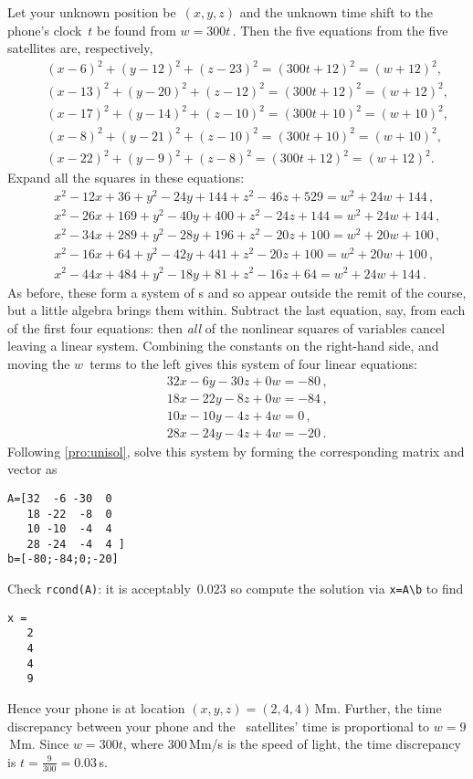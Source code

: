 \begin{example}
\begin{solution} 
Let your unknown position be~\((x,y,z)\) and the unknown time shift to the phone's clock~\(t\) be found from \(w=300t\)\,.
Then the five equations from the five satellites are, respectively,
\begin{eqnarray*}
&&(x-6)^2+(y-12)^2+(z-23)^2=(300t+12)^2=(w+12)^2,
\\&&(x-13)^2+(y-20)^2+(z-12)^2=(300t+12)^2=(w+12)^2,
\\&&(x-17)^2+(y-14)^2+(z-10)^2=(300t+10)^2=(w+10)^2,
\\&&(x-8)^2+(y-21)^2+(z-10)^2=(300t+10)^2=(w+10)^2,
\\&&(x-22)^2+(y-9)^2+(z-8)^2=(300t+12)^2=(w+12)^2.
\end{eqnarray*}
Expand all the squares in these equations:
\begin{eqnarray*}
&&x^2-12x+36+y^2-24y+144+z^2-46z+529=w^2+24w+144\,,
\\&&x^2-26x+169+y^2-40y+400+z^2-24z+144=w^2+24w+144\,,
\\&&x^2-34x+289+y^2-28y+196+z^2-20z+100=w^2+20w+100\,,
\\&&x^2-16x+64+y^2-42y+441+z^2-20z+100=w^2+20w+100\,,
\\&&x^2-44x+484+y^2-18y+81+z^2-16z+64=w^2+24w+144\,.
\end{eqnarray*}
As before, these form a system of s and so appear outside the remit of the course, but a little algebra brings them within.
Subtract the last equation, say, from each of the first four equations: then \emph{all} of the nonlinear squares of variables cancel leaving a linear system.
Combining the constants on the right-hand side, and moving the \(w\)~terms to the left gives this system of four linear equations:
\begin{eqnarray*}
&&32x-6y-30z+0w=-80\,,
\\&&18x-22y-8z+0w=-84\,,
\\&&10x-10y-4z+4w=0\,,
\\&&28x-24y-4z+4w=-20\,.
\end{eqnarray*}
Following \cref{pro:unisol}, solve this system by forming the corresponding matrix and vector as
\begin{verbatim}
A=[32  -6 -30  0
   18 -22  -8  0
   10 -10  -4  4
   28 -24  -4  4 ]
b=[-80;-84;0;-20]
\end{verbatim}
Check \verb|rcond(A)|: it is acceptably~\(0.023\) so compute the solution via \verb|x=A\b| to find
\setbox\ajrqrbox\hbox{}%
\marginajrbox%
\begin{verbatim}
x =
   2
   4
   4
   9
\end{verbatim}
Hence your phone is at location \((x,y,z)=(2,4,4)\)\,Mm. 
Further, the time discrepancy between your phone and the \gps\ satellites' time is proportional to \(w=9\)\,Mm.
Since \(w=300t\), where \(300\)\,Mm/s is the speed of light, the time discrepancy is \(t=\frac9{300}=0.03\)\,s.
\end{solution}
\end{example}
